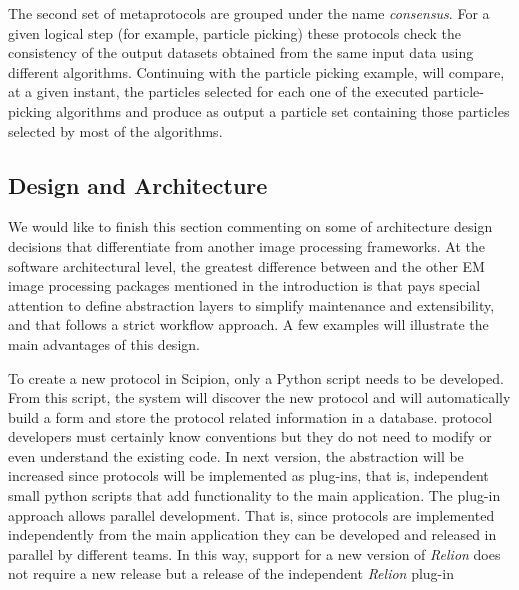 The second set of metaprotocols are grouped under the name \emph{consensus}. For a given logical step (for example, particle picking) these protocols check 
the consistency of the output datasets obtained from the same input data using different algorithms. Continuing with the particle picking example,  will compare, at a given instant, the particles selected for each one of the executed particle-picking algorithms and produce as output a particle set containing those particles selected by most of the algorithms.


\subsection{\scipion Design and Architecture}

We would like to finish this section commenting on some of \scipion architecture design decisions that differentiate \scipion from another image processing frameworks. At the software architectural level,  the greatest difference 
between \scipion and the other EM image processing packages mentioned in the introduction 
is that  \scipion pays special attention to define abstraction layers to simplify maintenance
and extensibility, and that follows a strict workflow approach. A few examples will illustrate the main advantages of this design.

To create a new protocol in Scipion, only a Python script needs to be developed. From this script, the system will discover the new protocol and will automatically build
a form and store the protocol related information in a database.
\scipion protocol developers must certainly know \scipion conventions
but they do not need to modify or even understand the existing code.
In  \scipion next version, the abstraction will be increased
since protocols will be implemented as plug-ins,
that is, independent small python scripts  that add functionality to the main
\scipion application. The plug-in approach allows parallel development. That is,  
since protocols are implemented independently from the main application
they can be developed and released in parallel by different teams. In this way, support for a new version of \textit{Relion} does not require a new \scipion release but
a release of the independent \textit{Relion} plug-in

